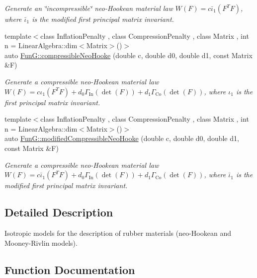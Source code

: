 \begin{DoxyCompactItemize}
\begin{DoxyCompactList}\small\item\em Generate an \char`\"{}incompressible\char`\"{} neo-\/\+Hookean material law $ W(F)=c\bar\iota_1(F^T F) $, where $\bar\iota_1$ is the modified first principal matrix invariant. \end{DoxyCompactList}\item 
{\footnotesize template$<$class Inflation\+Penalty , class Compression\+Penalty , class Matrix , int n = Linear\+Algebra\+::dim$<$\+Matrix$>$()$>$ }\\auto \hyperlink{group__Rubber_gac5c39cd9de55f4f0220a806cf28a7b30}{Fun\+G\+::compressible\+Neo\+Hooke} (double c, double d0, double d1, const Matrix \&F)
\begin{DoxyCompactList}\small\item\em Generate a compressible neo-\/\+Hookean material law $ W(F)=c\iota_1(F^T F)+d_0\Gamma_\mathrm{In}(\det(F))+d_1\Gamma_\mathrm{Co}(\det(F)) $, where $\iota_1$ is the first principal matrix invariant. \end{DoxyCompactList}\item 
{\footnotesize template$<$class Inflation\+Penalty , class Compression\+Penalty , class Matrix , int n = Linear\+Algebra\+::dim$<$\+Matrix$>$()$>$ }\\auto \hyperlink{group__Rubber_gac10942df03f037afdf0a81d330361a6b}{Fun\+G\+::modified\+Compressible\+Neo\+Hooke} (double c, double d0, double d1, const Matrix \&F)
\begin{DoxyCompactList}\small\item\em Generate a compressible neo-\/\+Hookean material law $ W(F)=c\bar\iota_1(F^T F)+d_0\Gamma_\mathrm{In}(\det(F))+d_1\Gamma_\mathrm{Co}(\det(F)) $, where $\bar\iota_1$ is the modified first principal matrix invariant. \end{DoxyCompactList}\end{DoxyCompactItemize}


\subsection{Detailed Description}
Isotropic models for the description of rubber materials (neo-\/\+Hookean and Mooney-\/\+Rivlin models). 



\subsection{Function Documentation}
